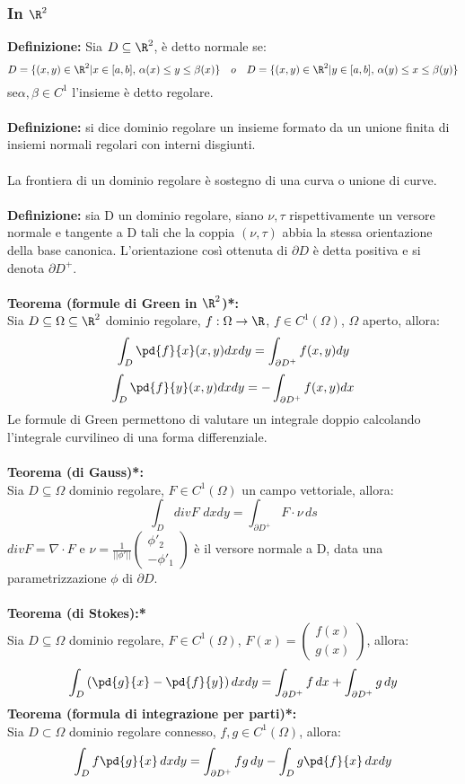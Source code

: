 \documentclass{article}
\begin{document}
\subsubsection{In $\R^2$}
\textbf{Definizione:} Sia $D\subseteq\R^2$, è detto normale se:
$$ D=\{ (x,y)\in\R^2|x\in[a,b],\,\alpha(x)\leq y\leq\beta(x) \}\quad o \quad D=\{ (x,y)\in\R^2|y\in[a,b],\,\alpha(y)\leq x\leq\beta(y) \}$$
se$\alpha,\beta\in C^1$ l'insieme è detto regolare.\\\\
\textbf{Definizione:} si dice dominio regolare un insieme formato da un unione finita di insiemi normali regolari con interni disgiunti.\\\\
La frontiera di un dominio regolare è sostegno di una curva o unione di curve.\\\\
\textbf{Definizione:} sia D un dominio regolare, siano $\nu,\tau$ rispettivamente un versore normale e tangente a D tali che la coppia $(\nu,\tau)$ abbia la stessa orientazione della base canonica. L'orientazione così ottenuta di $\partial D$ è detta positiva e si denota $\partial D^+$.\\\\
\textbf{Teorema (formule di Green in $\R^2$)*:}\\
Sia $D\subseteq\Omega\subseteq\R^2$ dominio regolare, $f:\Omega\rightarrow\R$, $f\in C^1(\Omega)$, $\Omega$ aperto, allora:
$$ \int_D\pd{f}{x}(x,y)dxdy=\int_{\partial D^+}f(x,y)dy $$
$$ \int_D\pd{f}{y}(x,y)dxdy=-\int_{\partial D^+}f(x,y)dx $$
Le formule di Green permettono di valutare un integrale doppio calcolando l'integrale curvilineo di una forma differenziale.\\\\
\textbf{Teorema (di Gauss)*:}\\
Sia $D\subseteq\Omega$ dominio regolare, $F\in C^1(\Omega)$ un campo vettoriale, allora:
$$ \int_DdivF\,\,dxdy=\int_{\partial D^+}F\cdot \nu \,ds $$
$divF=\nabla\cdot F$ e $\nu=\frac{1}{||\phi'||}\begin{pmatrix}\phi'_2\\-\phi'_1 \end{pmatrix}$ è il versore normale a D, data una parametrizzazione $\phi$ di $\partial D$.\\\\
\textbf{Teorema (di Stokes):*}\\
Sia $D\subseteq\Omega$ dominio regolare, $F\in C^1(\Omega)$, $F(x)=\begin{pmatrix}f(x)\\g(x)\end{pmatrix}$, allora:
$$ \int_D\left( \pd{g}{x}-\pd{f}{y} \right)dxdy=\int_{\partial D^+}f\,dx+\int_{\partial D^+}g\,dy $$
\textbf{Teorema (formula di integrazione per parti)*:}\\
Sia $D\subset\Omega$ dominio regolare connesso, $f,g\in C^1(\Omega)$, allora:
$$ \int_Df\pd{g}{x}\,dxdy=\int_{\partial D^+}fg\,dy-\int_Dg\pd{f}{x}\,dxdy $$
\end{document}
